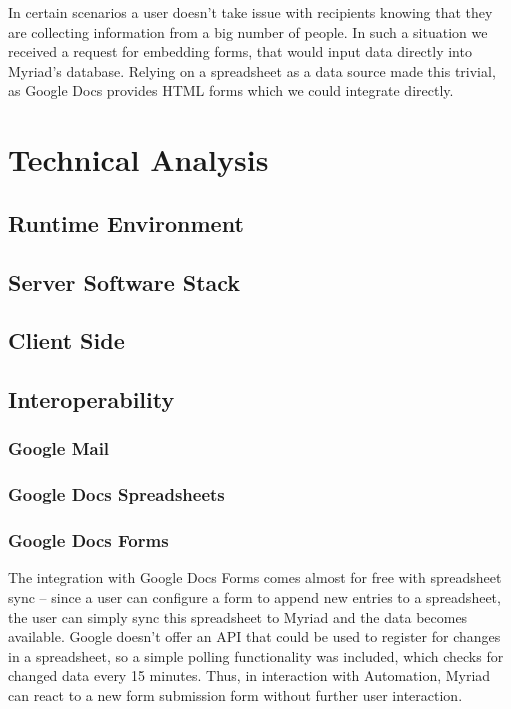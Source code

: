 In certain scenarios a user doesn't take issue with recipients knowing that they are collecting information from a big number of people. In such a situation we received a request for embedding forms, that would input data directly into Myriad’s database. Relying on a spreadsheet as a data source made this trivial, as Google Docs provides HTML forms which we could integrate directly.


%

\section{Technical Analysis}

\subsection{Runtime Environment}

\subsection{Server Software Stack}

\subsection{Client Side}

\subsection{Interoperability}


\subsubsection{Google Mail}


\subsubsection{Google Docs Spreadsheets}


\subsubsection{Google Docs Forms}

The integration with Google Docs Forms comes almost for free with spreadsheet sync -- since a user can configure a form to append new entries to a spreadsheet, the user can simply sync this spreadsheet to Myriad and the data becomes available.
Google doesn't offer an API that could be used to register for changes in a spreadsheet, so a simple polling functionality was included, which checks for changed data every 15 minutes. Thus, in interaction with Automation, Myriad can react to a new form submission form without further user interaction.

